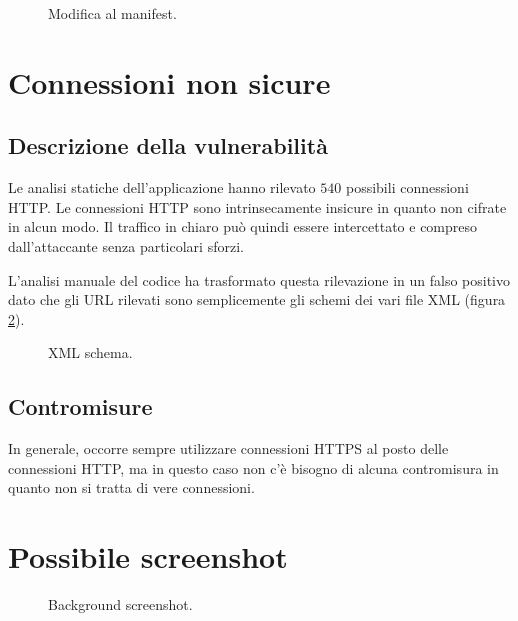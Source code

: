 \begin{figure}[h]
	\centering 
	\caption{Modifica al manifest.}
	\label{fig:pinningFile}
\end{figure}

\section{Connessioni non sicure}

\subsection{Descrizione della vulnerabilità}
Le analisi statiche dell'applicazione hanno rilevato $540$ possibili connessioni \ac{HTTP}. Le connessioni \ac{HTTP} sono intrinsecamente insicure in quanto non cifrate in alcun modo. Il traffico in chiaro può quindi essere intercettato e compreso dall'attaccante senza particolari sforzi.

L'analisi manuale del codice ha trasformato questa rilevazione in un falso positivo dato che gli \ac{URL} rilevati sono semplicemente gli schemi dei vari file \ac{XML} (figura \ref{fig:schema}).

\begin{figure}[h]
	\centering 
	\caption{XML schema.}
	\label{fig:schema}
\end{figure}

\subsection{Contromisure}
In generale, occorre sempre utilizzare connessioni \ac{HTTPS} al posto delle connessioni \ac{HTTP}, ma in questo caso non c'è bisogno di alcuna contromisura in quanto non si tratta di vere connessioni.

\section{Possibile screenshot}

\begin{figure}[h]
	\centering 
	\caption{Background screenshot.}
	\label{fig:background}
\end{figure}

